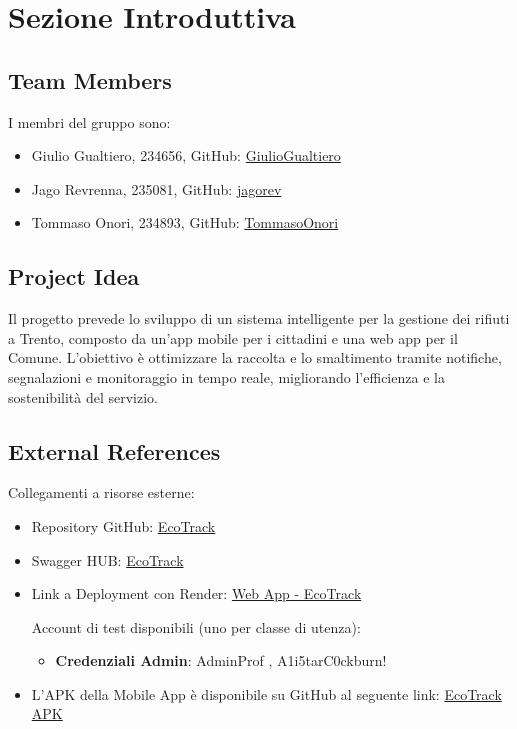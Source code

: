 \section{Sezione Introduttiva}

\subsection{Team Members}
I membri del gruppo sono:
\begin{itemize} 
    \item Giulio Gualtiero, 234656, GitHub: \href{https://github.com/GiulioGualtiero}{GiulioGualtiero}
    \item Jago Revrenna, 235081, GitHub: \href{https://github.com/jagorev}{jagorev}
    \item Tommaso Onori, 234893, GitHub: \href{https://github.com/TommasoOnori}{TommasoOnori}
\end{itemize}

\subsection{Project Idea}
Il progetto prevede lo sviluppo di un sistema intelligente per la gestione dei rifiuti a Trento, composto da un'app mobile per i cittadini e una web app per il Comune. L'obiettivo è ottimizzare la raccolta e lo smaltimento tramite notifiche, segnalazioni e monitoraggio in tempo reale, migliorando l'efficienza e la sostenibilità del servizio.
\subsection{External References}
Collegamenti a risorse esterne:
\begin{itemize}
    \item Repository GitHub: \href{https://github.com/jagorev/EcoTrack}{EcoTrack}
    \item Swagger HUB: \href{ https://app.swaggerhub.com/apis-docs/universityoftrento/EcoTrackAPI/1.0.0#/}{EcoTrack}
    \item Link a Deployment con Render: \href{https://ecotrack-6pp4.onrender.com/}{Web App - EcoTrack}

Account di test disponibili (uno per classe di utenza):

\begin{itemize}
    \item \textbf{Credenziali Admin}: AdminProf , A1i5tarC0ckburn!
\end{itemize}

\item L'APK della Mobile App è disponibile su GitHub al seguente link: \href{https://github.com/jagorev/EcoTrack/tree/main/apk%20mobile%20app}{EcoTrack APK}


    
\end{itemize}

